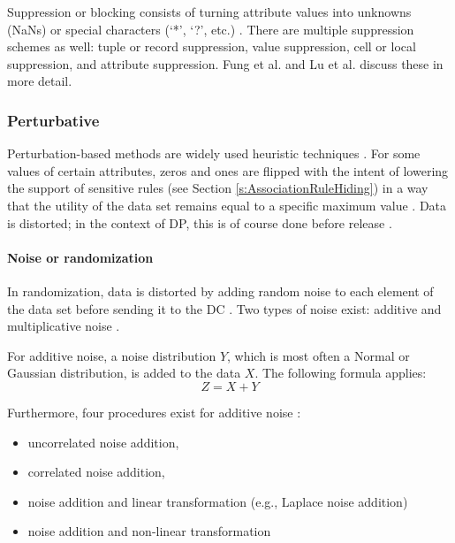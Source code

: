         Suppression or blocking consists of turning attribute values into unknowns (NaNs) or special characters (`*', `?', etc.) \cite{Lu2021,Zhang2019}.
        There are multiple suppression schemes as well: tuple or record suppression, value suppression, cell or local suppression, and attribute suppression.
        Fung et al. \cite{Fung2010} and Lu et al. \cite{Lu2021} discuss these in more detail.

    \subsubsection{Perturbative}

    Perturbation-based methods are widely used heuristic techniques \cite{Mendes2017}.
    For some values of certain attributes, zeros and ones are flipped with the intent of lowering the support of sensitive rules 
	 (see Section \ref{s:AssociationRuleHiding}) in a way that the utility of the data set remains equal to a specific maximum value \cite{Mendes2017}.
    Data is distorted; in the context of \gls{DP}, this is of course done before release \cite{Lu2021}.
    
        \paragraph{Noise or randomization}
        \label{s:NoiseRandomization}

        In randomization, data is distorted by adding random noise to each element of the data set before sending it to the \gls{DC} \cite{Mendes2017}.
        Two types of noise exist: additive and multiplicative noise \cite{Lu2021, Mendes2017}.
        
        For additive noise, a noise distribution $Y$, which is most often a Normal or Gaussian distribution, is added to the data $X$. 
        The following formula applies: 
        \begin{equation}
        \label{eqn:Additive_noise}
            Z = X + Y
        \end{equation}

        Furthermore, four procedures exist for additive noise \cite{Lu2021}:
        \begin{itemize}
            \item uncorrelated noise addition,
            \item correlated noise addition,
            \item noise addition and linear transformation (e.g., Laplace noise addition) 
            \item noise addition and non-linear transformation
        \end{itemize}

